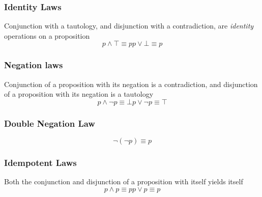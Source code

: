 \documentclass[twocolumn]{report}
\begin{document}
\subsubsection{Identity Laws}
Conjunction with a tautology, and disjunction with a contradiction, are \textit{identity} operations on a proposition 
\begin{subequations}
\begin{equation}
	p \wedge \top \equiv p
	\label{eqn: conjunction-identity-law}
\end{equation}
\begin{equation}
	p \lor \bot \equiv p
	\label{eqn: disjuction-identity-law}
\end{equation}
\end{subequations}
\subsubsection{Negation laws}
Conjunction of a proposition with its negation is a contradiction, and disjunction of a proposition with its negation is a tautology
\begin{subequations}
	\begin{equation}
		p \wedge \neg p \equiv \bot
		\label{eqn: conjunction-negation-law}
	\end{equation}
	\begin{equation}
		p \lor \neg p \equiv \top
		\label{eqn: disjunction-negation-law}
	\end{equation}
\end{subequations}
\subsubsection{Double Negation Law}
\begin{subequations}
	\begin{equation}
		\neg (\neg p) \equiv p
		\label{eqn: double-negation-law}
	\end{equation}
\end{subequations}
\subsubsection{Idempotent Laws}
Both the conjunction and disjunction of a proposition with itself yields itself
\begin{subequations}
	\begin{equation}
		p \wedge p \equiv p
		\label{eqn: idempotent-conjunction}
	\end{equation}
	\begin{equation}
		p \lor p \equiv p
		\label{eqn: idempotent-disjunction}
	\end{equation}
\end{subequations}
\end{document}
